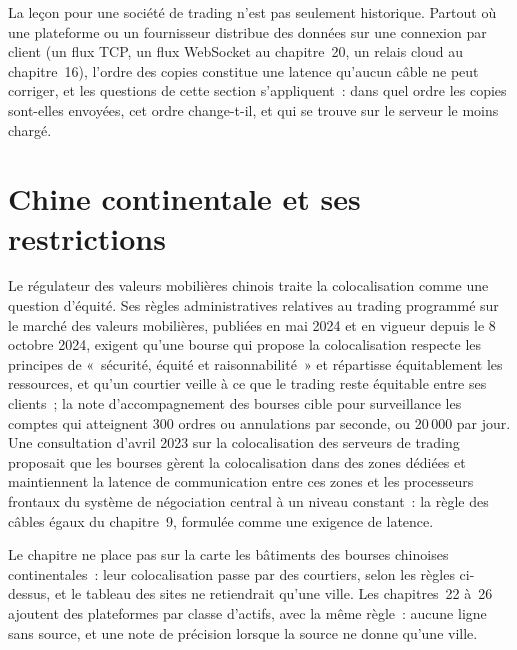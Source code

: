 La leçon pour une société de trading n'est pas seulement historique. Partout où une plateforme ou un fournisseur distribue des données sur une connexion par client (un
flux TCP, un flux WebSocket au chapitre~20, un relais cloud au chapitre~16), l'ordre des copies constitue une latence qu'aucun câble ne peut corriger, et les
questions de cette section s'appliquent~: dans quel ordre les copies sont-elles envoyées, cet ordre change-t-il, et qui se trouve sur le serveur le moins chargé.

\section{Chine continentale et ses restrictions}

Le régulateur des valeurs mobilières chinois traite la colocalisation comme une question d'équité. Ses règles administratives relatives au trading programmé sur le
marché des valeurs mobilières, publiées en mai 2024 et en vigueur depuis le 8 octobre 2024, exigent qu'une bourse qui propose la colocalisation respecte les principes
de «~sécurité, équité et raisonnabilité~» et répartisse équitablement les ressources, et qu'un courtier veille à ce que le trading reste équitable entre ses clients~; la
note d'accompagnement des bourses cible pour surveillance les comptes qui atteignent 300 ordres ou annulations par seconde, ou 20\,000 par jour. Une
consultation d'avril 2023 sur la colocalisation des serveurs de trading proposait que les bourses gèrent la colocalisation dans des zones dédiées et maintiennent
la latence de communication entre ces zones et les processeurs frontaux du système de négociation central à un niveau constant~: la règle des câbles égaux du
chapitre~9, formulée comme une exigence de latence.

\begin{remark}\label{rem:nw:the-asia-pacific-map:leftout}
Le chapitre ne place pas sur la carte les bâtiments des bourses chinoises continentales~: leur colocalisation passe par des courtiers, selon les règles
ci-dessus, et le tableau des sites ne retiendrait qu'une ville. Les chapitres~22 à~26 ajoutent des plateformes par classe d'actifs, avec la même règle~: aucune ligne
sans source, et une note de précision lorsque la source ne donne qu'une ville.
\end{remark}

